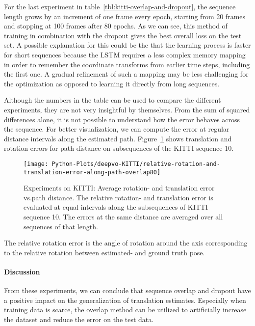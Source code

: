 		For the last experiment in table~\ref{tbl:kitti-overlap-and-dropout}, the sequence length grows by an increment of one frame every epoch, starting from 20 frames and stopping at 100 frames after 80 epochs.
		As we can see, this method of training in combination with the dropout gives the best overall loss on the test set.
		A possible explanation for this could be the that the learning process is faster for short sequences because the LSTM requires a less complex memory mapping in order to remember the coordinate transforms from earlier time steps, including the first one.
		A gradual refinement of such a mapping may be less challenging for the optimization as opposed to learning it directly from long sequences.
		
		Although the numbers in the table can be used to compare the different experiments, they are not very insightful by themselves.
		From the sum of squared differences alone, it is not possible to understand how the error behaves across the sequence.
		For better visualization, we can compute the error at regular distance intervals along the estimated path.
		Figure~\ref{fig:kitti-avg-rotation-translation-error-vs-path-distance} shows translation and rotation errors for path distance on subsequences of the KITTI sequence 10.
		\begin{figure}[t]
			\centering
			\texttt{[image: Python-Plots/deepvo-KITTI/relative-rotation-and-translation-error-along-path-overlap80]}
			\caption[Experiments on KITTI: Average rotation- and translation error vs.\@ path distance]
					{Experiments on KITTI: Average rotation- and translation error vs.\@ path distance.
					 The relative rotation- and translation error is evaluated at equal intervals along the subsequences of KITTI sequence 10.
					 The errors at the same distance are averaged over all sequences of that length.
					 \label{fig:kitti-avg-rotation-translation-error-vs-path-distance}}
		\end{figure}
		The relative rotation error is the angle of rotation around the axis corresponding to the relative rotation between estimated- and ground truth pose.
		
		\paragraph{Discussion}
		From these experiments, we can conclude that sequence overlap and dropout have a positive impact on the generalization of translation estimates.
		Especially when training data is scarce, the overlap method can be utilized to artificially increase the dataset and reduce the error on the test data.
		
